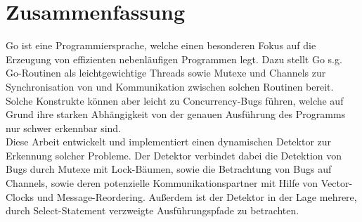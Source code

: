 \chapter*{Zusammenfassung}
Go ist eine Programmiersprache, welche einen besonderen Fokus auf 
die Erzeugung von effizienten nebenläufigen Programmen legt. Dazu 
stellt Go s.g. Go-Routinen als leichtgewichtige Threads sowie 
Mutexe und Channels zur Synchronisation von und Kommunikation zwischen 
solchen Routinen bereit. Solche Konstrukte können aber leicht zu 
Concurrency-Bugs führen, welche auf Grund ihre starken Abhängigkeit von der 
genauen Ausführung des Programms nur schwer erkennbar sind.\\
Diese Arbeit entwickelt und implementiert einen dynamischen Detektor zur
Erkennung solcher Probleme. Der Detektor verbindet dabei die Detektion 
von Bugs durch Mutexe mit Lock-Bäumen, sowie die Betrachtung von 
Bugs auf Channels, sowie deren potenzielle Kommunikationspartner mit Hilfe von 
Vector-Clocks und Message-Reordering. Außerdem ist der Detektor in der 
Lage mehrere, durch Select-Statement verzweigte Ausführungspfade zu betrachten.